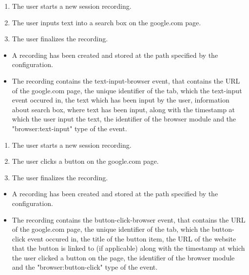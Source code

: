 \begin{tests}
	{\begin{enumerate}
		\item The \gls{user} starts a new \gls{session} recording.
		\item The \gls{user} inputs text into a search box on the google.com page.
		\item The \gls{user} finalizes the recording.
	\end{enumerate}}
	{\begin{itemize}
		\item A recording has been created and stored at the path specified by the configuration.
		\item The recording contains the text-input-browser \gls{event},  that contains the URL of the google.com page, the unique identifier of the tab, which the text-input \gls{event} occured in, the text which has been input by the \gls{user}, information about search box, where text has been input, along with the timestamp at which the \gls{user} input the text, the identifier of the \gls{browser} module and the "browser:text-input" type of the event.
	\end{itemize}}
	
	
	{\begin{enumerate}
		\item The \gls{user} starts a new \gls{session} recording.
		\item The \gls{user} clicks a button on the google.com page.
		\item The \gls{user} finalizes the recording.
	\end{enumerate}}
	{\begin{itemize}
		\item A recording has been created and stored at the path specified by the configuration.
		\item The recording contains the button-click-browser \gls{event},  that contains the URL of the google.com page, the unique identifier of the tab, which the button-click \gls{event} occured in, the title of the button item, the URL of the website that the button is linked to (if applicable) along with the timestamp at which the \gls{user} clicked a button on the page, the identifier of the \gls{browser} module and the "browser:button-click" type of the event.
	\end{itemize}}
	

\end{tests}
